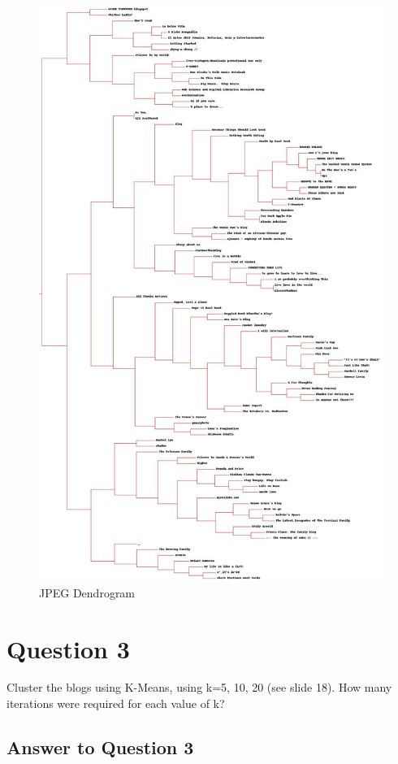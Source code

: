 \documentclass{article}
\begin{document}
\begin{figure}[H]
\centering
\includegraphics[scale=0.30]{q02/blogclust}
\caption{JPEG Dendrogram}
\label{blogclust}
\end{figure}

\newpage
\section*{Question 3}
Cluster the blogs using K-Means, using k=5, 10, 20 (see slide 18). How many iterations were required for each value of k?

\subsection*{Answer to Question 3}
\end{document}
